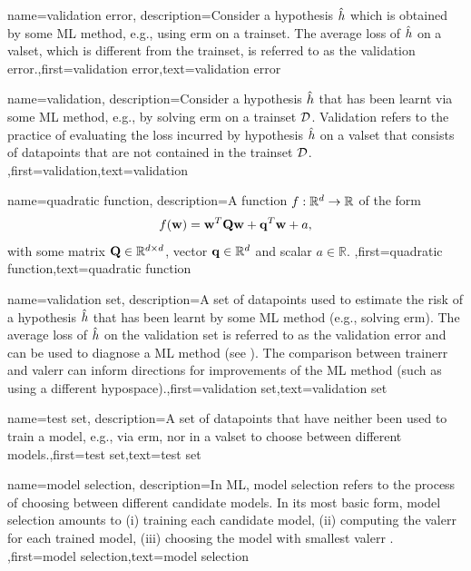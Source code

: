 {name={validation error},
 description={Consider a \gls{hypothesis} $\hat{h}$ which is 
 	obtained by some ML method, e.g., using \gls{erm} on a \gls{trainset}. The average \gls{loss} 
 	of $\hat{h}$ on a \gls{valset}, which is different from the \gls{trainset}, is referred 
 	to as the validation error.},first={validation error},text={validation error}  
}

{name={validation},
	description={Consider a \gls{hypothesis} $\hat{h}$ that has been 
		learnt via some ML method, e.g., by solving \gls{erm} on a \gls{trainset} $\mathcal{D}$. 
		Validation refers to the practice of evaluating the \gls{loss} incurred by 
		\gls{hypothesis} $\hat{h}$ on a \gls{valset} that consists of 
		\gls{datapoint}s that are not contained in the \gls{trainset} $\mathcal{D}$. },first={validation},text={validation}  
}

{name={quadratic function},
	description={A function $f: \mathbb{R}^{d} \rightarrow \mathbb{R}$ of the form 
	$$f({\bf w}) =  {\bf w}^{T} \mathbf{Q} \mathbf{w} + \mathbf{q}^{T} {\bf w}+a,$$ with 
	some matrix $\mathbf{Q} \in \mathbb{R}^{d \times d}$, vector ${\bf q} \in \mathbb{R}^{d}$ 
	and scalar $a \in \mathbb{R}$.  },first={quadratic function},text={quadratic function}  
}

{name={validation set},
  description={A set of \gls{datapoint}s used to estimate 
  	the \gls{risk} of a \gls{hypothesis} $\hat{h}$ that has been learnt by some 
  	ML method (e.g., solving \gls{erm}). The average \gls{loss} of $\hat{h}$ 
  	on the validation set is referred to as the validation error and can be used to diagnose a 
  	ML method (see \cite[Sec. 6.6.]{MLBasics}). The comparison between \gls{trainerr} 
  	and \gls{valerr} can inform directions for improvements of the ML method (such as 
  	using a different \gls{hypospace}).},first={validation set},text={validation set}  
}

{name={test set},
	description={A set of \gls{datapoint}s that have neither 
		been used to train a \gls{model}, e.g., via \gls{erm}, nor in a \gls{valset} 
		to choose between different \gls{model}s.},first={test set},text={test set}  
}


{name={model selection},
	description={In ML, model selection refers to the 
		process of choosing between different candidate \gls{model}s. In its most 
		basic form, \gls{model} selection amounts to (i) training each candidate \gls{model}, 
		(ii) computing the \gls{valerr} for each trained \gls{model}, (iii) choosing the \gls{model} 
		with smallest \gls{valerr} \cite[Ch. 6]{MLBasics}. },first={model selection},text={model selection}  
}





